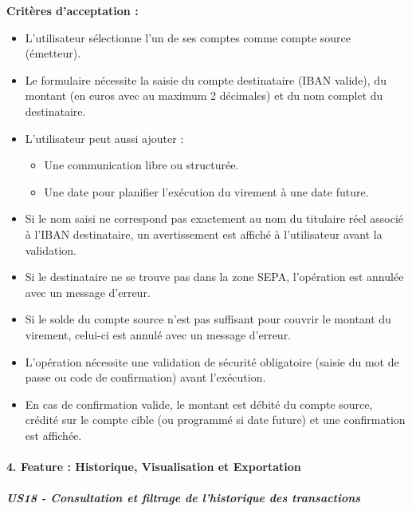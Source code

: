 \textbf{Critères d'acceptation :}

\begin{itemize}
\tightlist
\item
  L'utilisateur sélectionne l'un de ses comptes comme compte source
  (émetteur).
\item
  Le formulaire nécessite la saisie du compte destinataire (IBAN
  valide), du montant (en euros avec au maximum 2 décimales) et du nom
  complet du destinataire.
\item
  L'utilisateur peut aussi ajouter :

  \begin{itemize}
  \tightlist
  \item
    Une communication libre ou structurée.
  \item
    Une date pour planifier l'exécution du virement à une date future.
  \end{itemize}
\item
  Si le nom saisi ne correspond pas exactement au nom du titulaire réel
  associé à l'IBAN destinataire, un avertissement est affiché à
  l'utilisateur avant la validation.
\item
  Si le destinataire ne se trouve pas dans la zone SEPA, l'opération est
  annulée avec un message d'erreur.
\item
  Si le solde du compte source n'est pas suffisant pour couvrir le
  montant du virement, celui-ci est annulé avec un message d'erreur.
\item
  L'opération nécessite une validation de sécurité obligatoire (saisie
  du mot de passe ou code de confirmation) avant l'exécution.
\item
  En cas de confirmation valide, le montant est débité du compte source,
  crédité sur le compte cible (ou programmé si date future) et une
  confirmation est affichée.
\end{itemize}

\hypertarget{feature-historique-visualisation-et-exportation}{%
\paragraph{4. Feature : Historique, Visualisation et
Exportation}\label{feature-historique-visualisation-et-exportation}}

\hypertarget{us18---consultation-et-filtrage-de-lhistorique-des-transactions}{%
\subparagraph{US18 - Consultation et filtrage de l'historique des
transactions}\label{us18---consultation-et-filtrage-de-lhistorique-des-transactions}}

